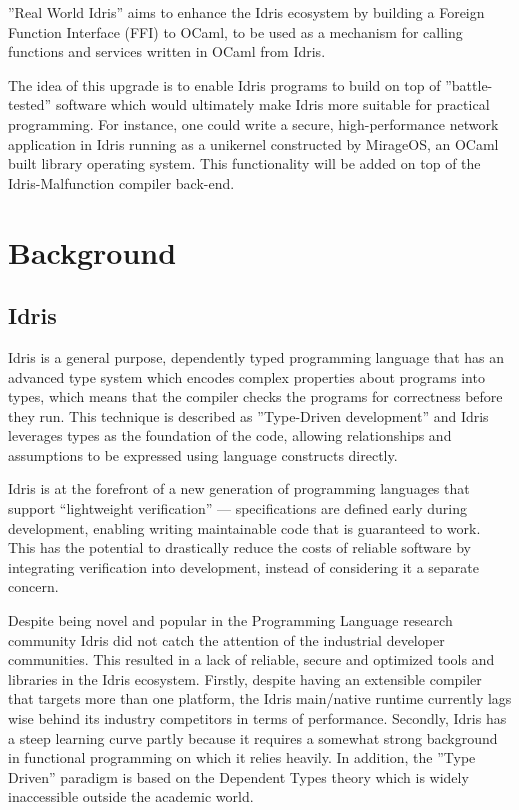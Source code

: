 \documentclass[a4paper]{report}
\begin{document}
''Real World Idris'' aims to enhance the Idris ecosystem by building a Foreign
Function Interface (FFI) to OCaml, to be used as a mechanism for calling
functions and services written in OCaml from Idris.

The idea of this upgrade is to enable Idris programs to build on top of
''battle-tested'' software which would ultimately make Idris more suitable
for practical programming.
For instance, one could write a secure, high-performance network application in Idris running as a unikernel constructed by MirageOS, an OCaml built library
operating system.
This functionality will be added on top of the Idris-Malfunction compiler
back-end.

\section{Background}

\subsection{Idris}
Idris is a general purpose, dependently typed programming language that has an
advanced type system which encodes complex properties about programs into
types, which means that the compiler checks the programs for correctness
before they run.
This technique is described as ''Type-Driven development'' and Idris leverages
types as the foundation of the code, allowing relationships and assumptions to
be expressed using language constructs directly.

Idris is at the forefront of a new generation of programming languages
that support “lightweight verification” --- specifications are defined
early during development, enabling writing maintainable code that is
guaranteed to work.
This has the potential to drastically reduce the costs of reliable software by
integrating verification into development, instead of considering it a separate
concern.

Despite being novel and popular in the Programming Language research community
Idris did not catch the attention of the industrial developer communities.
This resulted in a lack of reliable, secure and optimized tools and libraries
in the Idris ecosystem.
Firstly, despite having an extensible compiler that targets more than one
platform, the Idris main/native runtime currently lags wise behind
its industry competitors in terms of performance.
Secondly, Idris has a steep learning curve partly because it requires
a somewhat strong background in functional programming on which it relies
heavily.
In addition, the ''Type Driven'' paradigm is based on the Dependent Types
theory which is widely inaccessible outside the academic world.
\end{document}
